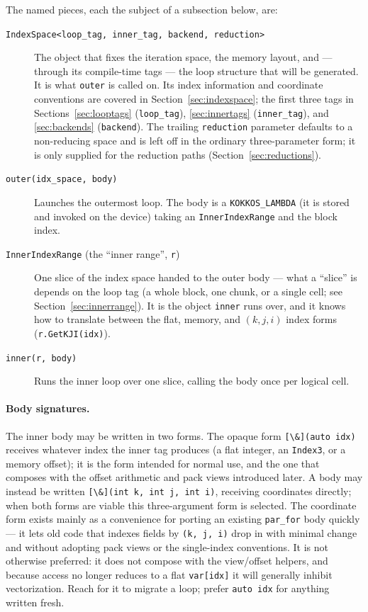 \documentclass[11pt]{article}
\newcommand{\code}[1]{\lstinline[basicstyle=\ttfamily]|#1|}
\newcommand{\codelbl}[1]{\texttt{#1}}
\begin{document}
The named pieces, each the subject of a subsection below, are:
\begin{description}
\item[\codelbl{IndexSpace<loop\_tag, inner\_tag, backend, reduction>}] The object
  that fixes the iteration space, the memory layout, and --- through its compile-time
  tags --- the loop structure that will be generated. It is what \code{outer} is
  called on. Its index information and coordinate conventions are covered in
  Section~\ref{sec:indexspace}; the first three tags in Sections~\ref{sec:looptags}
  (\code{loop_tag}), \ref{sec:innertags} (\code{inner_tag}), and
  \ref{sec:backends} (\code{backend}). The trailing \code{reduction} parameter
  defaults to a non-reducing space and is left off in the ordinary
  \mbox{three-parameter} form; it is only supplied for the reduction paths
  (Section~\ref{sec:reductions}).
\item[\codelbl{outer(idx\_space, body)}] Launches the outermost loop. The body is
  a \code{KOKKOS_LAMBDA} (it is stored and invoked on the device) taking an
  \code{InnerIndexRange} and the block index.
\item[\codelbl{InnerIndexRange} (the ``inner range'', \codelbl{r})] One slice of
  the index space handed to the outer body --- what a ``slice'' is depends on the
  loop tag (a whole block, one chunk, or a single cell; see
  Section~\ref{sec:innerrange}). It is the object \code{inner} runs over, and it
  knows how to translate between the flat, memory, and $(k,j,i)$ index forms
  (\code{r.GetKJI(idx)}).
\item[\codelbl{inner(r, body)}] Runs the inner loop over one slice, calling the
  body once per logical cell.
\end{description}

\paragraph{Body signatures.} The inner body may be written in two forms. The
opaque form \code{[\&](auto idx)} receives whatever index the inner tag produces
(a flat integer, an \code{Index3}, or a memory offset); it is the form intended for
normal use, and the one that composes with the offset arithmetic and pack views
introduced later. A body may instead be written \code{[\&](int k, int j, int i)},
receiving coordinates directly; when both forms are viable this three-argument form
is selected. The coordinate form exists mainly as a convenience for porting an
existing \code{par_for} body quickly --- it lets old code that indexes fields by
\code{(k, j, i)} drop in with minimal change and without adopting pack views or the
single-index conventions. It is not otherwise preferred: it does not compose with
the view/offset helpers, and because access no longer reduces to a flat
\code{var[idx]} it will generally inhibit vectorization. Reach for it to migrate a
loop; prefer \code{auto idx} for anything written fresh.
\end{document}
